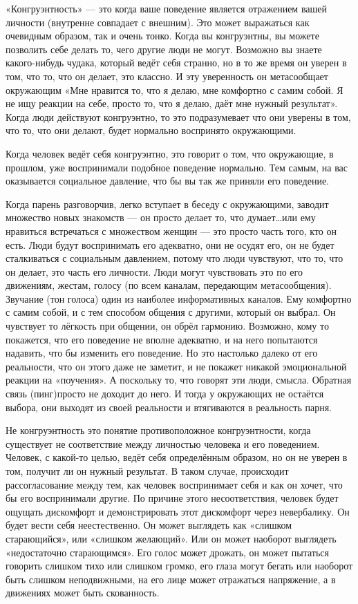 «Конгруэнтность» --- это когда ваше поведение является отражением вашей личности (внутренне совпадает с внешним). Это может выражаться как очевидным образом, так и очень тонко. Когда вы конгруэнтны, вы можете позволить себе делать то, чего другие люди не могут. Возможно вы знаете какого-нибудь чудака, который ведёт себя странно, но в то же время он уверен в том, что то, что он делает, это классно. И эту уверенность он метасообщает окружающим «Мне нравится то, что я делаю, мне комфортно с самим собой. Я не ищу реакции на себе, просто то, что я делаю, даёт мне нужный результат». Когда люди действуют конгруэнтно, то это подразумевает что они уверены в том, что то, что они делают, будет нормально воспринято окружающими.

Когда человек ведёт себя конгруэнтно, это говорит о том, что окружающие, в прошлом, уже воспринимали подобное поведение нормально. Тем самым, на вас оказывается социальное давление, что бы вы так же приняли его поведение.

Когда парень разговорчив, легко вступает в беседу с окружающими, заводит множество новых знакомств --- он просто делает то, что думает\ldots или ему нравиться встречаться с множеством женщин --- это просто часть того, кто он есть. Люди будут воспринимать его адекватно, они не осудят его, он не будет сталкиваться с социальным давлением, потому что люди чувствуют, что то, что он делает, это часть его личности. Люди могут чувствовать это по его движениям, жестам, голосу (по всем каналам, передающим метасообщения). Звучание (тон голоса) один из наиболее информативных каналов. Ему комфортно с самим собой, и с тем способом общения с другими, который он выбрал. Он чувствует то лёгкость при общении, он обрёл гармонию. Возможно, кому то покажется, что его поведение не вполне адекватно, и на него попытаются надавить, что бы изменить его поведение. Но это настолько далеко от его реальности, что он этого даже не заметит, и не покажет никакой эмоциональной реакции на «поучения». А поскольку то, что говорят эти люди, смысла. Обратная связь (пинг)просто не доходит до него. И тогда у окружающих не остаётся выбора, они выходят из своей реальности и втягиваются в реальность парня.

Не конгруэнтность это понятие противоположное конгруэнтности, когда существует не соответствие между личностью человека и его поведением. Человек, с какой-то целью, ведёт себя определённым образом, но он не уверен в том, получит ли он нужный результат. В таком случае, происходит рассогласование между тем, как человек воспринимает себя и как он хочет, что бы его воспринимали другие. По причине этого несоответствия, человек будет ощущать дискомфорт и демонстрировать этот дискомфорт через невербалику. Он будет вести себя неестественно. Он может выглядеть как «слишком старающийся», или «слишком желающий». Или он может наоборот выглядеть «недостаточно старающимся». Его голос может дрожать, он может пытаться говорить слишком тихо или слишком громко, его глаза могут бегать или наоборот быть слишком неподвижными, на его лице может отражаться напряжение, а в движениях может быть скованность.

